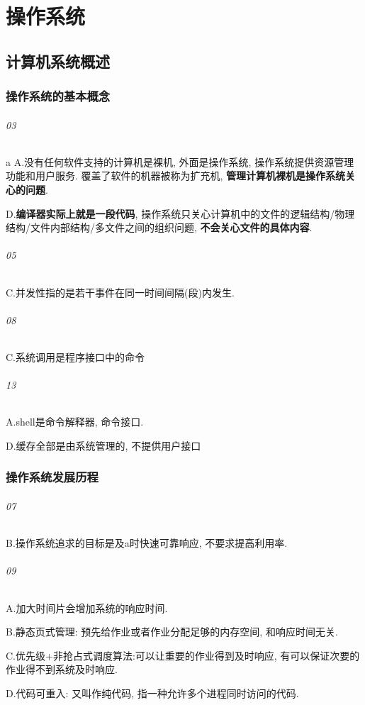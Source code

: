 \part{操作系统}
\chapter{计算机系统概述}
\section{操作系统的基本概念}
\paragraph{03}a A.没有任何软件支持的计算机是裸机, 外面是操作系统, 操作系统提供资源管理功能和用户服务. 覆盖了软件的机器被称为扩充机, \textbf{管理计算机裸机是操作系统关心的问题}.\par D.\textbf{编译器实际上就是一段代码}, 操作系统只关心计算机中的文件的逻辑结构/物理结构/文件内部结构/多文件之间的组织问题, \textbf{不会关心文件的具体内容}.
\paragraph{05} C.并发性指的是若干事件在同一时间间隔(段)内发生.
\paragraph{08} C.系统调用是程序接口中的命令
\paragraph{13} A.shell是命令解释器, 命令接口.\par D.缓存全部是由系统管理的, 不提供用户接口
\section{操作系统发展历程}
\paragraph{07} B.操作系统追求的目标是及a时快速可靠响应, 不要求提高利用率.
\paragraph{09} A.加大时间片会增加系统的响应时间.\par B.静态页式管理: 预先给作业或者作业分配足够的内存空间, 和响应时间无关.\par C.优先级+非抢占式调度算法:可以让重要的作业得到及时响应, 有可以保证次要的作业得不到系统及时响应. \par D.代码可重入: 又叫作纯代码, 指一种允许多个进程同时访问的代码.
